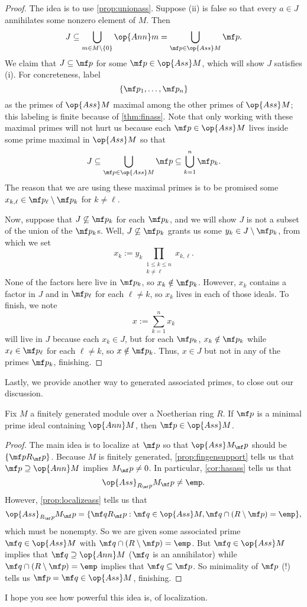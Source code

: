 \begin{proof}
	The idea is to use \autoref{prop:unionass}. Suppose (ii) is false so that every $a\in J$ annihilates some nonzero element of $M$. Then
	\[J\subseteq\bigcup_{m\in M\setminus\{0\}}\op{Ann}m=\bigcup_{\mf p\in\op{Ass}M}\mf p.\]
	We claim that $J\subseteq\mf p$ for some $\mf p\in\op{Ass}M$, which will show $J$ satisfies (i). For concreteness, label
	\[\{\mf p_1,\ldots,\mf p_n\}\]
	as the primes of $\op{Ass}M$ maximal among the other primes of $\op{Ass}M$; this labeling is finite because of \autoref{thm:finass}. Note that only working with these maximal primes will not hurt us because each $\mf p\in\op{Ass}M$ lives inside some prime maximal in $\op{Ass}M$ so that
	\[J\subseteq\bigcup_{\mf p\in\op{Ass}M}\mf p\subseteq\bigcup_{k=1}^n\mf p_k.\]
	The reason that we are using these maximal primes is to be promised some $x_{k,\ell}\in\mf p_\ell\setminus\mf p_k$ for $k\ne\ell$.
	
	Now, suppose that $J\not\subseteq\mf p_k$ for each $\mf p_k$, and we will show $J$ is not a subset of the union of the $\mf p_k$s. Well, $J\not\subseteq\mf p_k$ grants us some $y_k\in J\setminus\mf p_k$, from which we set
	\[x_k:=y_k\prod_{\substack{1\le k\le n\\k\ne\ell}}x_{k,\ell}.\]
	None of the factors here live in $\mf p_k$, so $x_k\notin\mf p_k$. However, $x_k$ contains a factor in $J$ and in $\mf p_\ell$ for each $\ell\ne k$, so $x_k$ lives in each of those ideals. To finish, we note
	\[x:=\sum_{k=1}^nx_k\]
	will live in $J$ because each $x_k\in J$, but for each $\mf p_k$, $x_k\notin\mf p_k$ while $x_\ell\in\mf p_\ell$ for each $\ell\ne k$, so $x\notin\mf p_k$. Thus, $x\in J$ but not in any of the primes $\mf p_k$, finishing.
\end{proof}
Lastly, we provide another way to generated associated primes, to close out our discussion.
\begin{prop} \label{prop:minassprimes}
	Fix $M$ a finitely generated module over a Noetherian ring $R$. If $\mf p$ is a minimal prime ideal containing $\op{Ann}M$, then $\mf p\in\op{Ass}M$.
\end{prop}
\begin{proof}
	The main idea is to localize at $\mf p$ so that $\op{Ass}M_\mf p$ should be $\{\mf pR_\mf p\}$. Because $M$ is finitely generated, \autoref{prop:fingensupport} tells us that $\mf p\supseteq\op{Ann}M$ implies $M_\mf p\ne0$. In particular, \autoref{cor:hasass} tells us that
	\[\op{Ass}_{R_\mf p}M_\mf p\ne\emp.\]
	However, \autoref{prop:localizeass} tells us that
	\[\op{Ass}_{R_\mf p}M_\mf p=\{\mf qR_\mf p:\mf q\in\op{Ass}M,\mf q\cap(R\setminus\mf p)=\emp\},\]
	which must be nonempty. So we are given some associated prime $\mf q\in\op{Ass}M$ with $\mf q\cap(R\setminus\mf p)=\emp$. But $\mf q\in\op{Ass}M$ implies that $\mf q\supseteq\op{Ann}M$ ($\mf q$ is an annihilator) while $\mf q\cap(R\setminus\mf p)=\emp$ implies that $\mf q\subseteq\mf p$. So minimality of $\mf p$ (!) tells us $\mf p=\mf q\in\op{Ass}M$, finishing.
\end{proof}
\begin{quot}
	I hope you see how powerful this idea is, of localization.
\end{quot}

